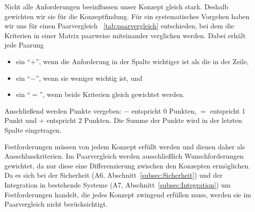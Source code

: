 Nicht alle Anforderungen beeinflussen unser Konzept gleich stark. Deshalb gewichten wir sie für die Konzeptfindung. Für ein systematisches Vorgehen haben wir uns für einen Paarvergleich ~\ref{tab:paarvergleich}  entschieden, bei dem die Kriterien in einer Matrix paarweise miteinander verglichen werden. Dabei erhält jede Paarung
\begin{itemize}
    \item ein \enquote{$+$}, wenn die Anforderung in der Spalte wichtiger ist als die in der Zeile,
    \item ein \enquote{$-$}, wenn sie weniger wichtig ist, und
    \item ein \enquote{$=$}, wenn beide Kriterien gleich gewichtet werden.
\end{itemize}
Anschließend werden Punkte vergeben: $-$ entspricht 0 Punkten, $=$ entspricht 1 Punkt und $+$ entspricht 2 Punkten. Die Summe der Punkte wird in der letzten Spalte eingetragen.

Festforderungen müssen von jedem Konzept erfüllt werden und dienen daher als Ausschlusskriterien. Im Paarvergleich werden ausschließlich Wunschforderungen gewichtet, da nur diese eine Differenzierung zwischen den Konzepten ermöglichen. Da es sich bei der Sicherheit (A6, Abschnitt~\ref{subsec:Sicherheit}) und der Integration in bestehende Systeme (A7, Abschnitt~\ref{subsec:Integration}) um Festforderungen handelt, die jedes Konzept zwingend erfüllen muss, werden sie im Paarvergleich nicht berücksichtigt.

